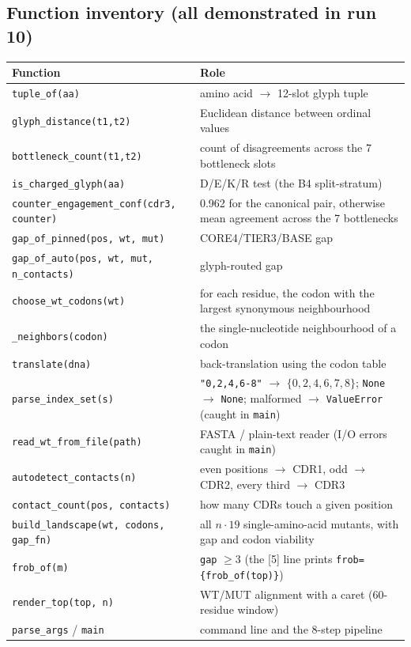 \documentclass{article}
\begin{document}
\subsection{Function inventory (all demonstrated in run 10)}

\begin{longtable}{@{}p{}p{}@{}}
\toprule
\textbf{Function} & \textbf{Role} \\
\midrule
\endhead
\texttt{tuple\_of(aa)} & amino acid \(\to\) 12-slot glyph tuple \\
\texttt{glyph\_distance(t1,t2)} & Euclidean distance between ordinal values \\
\texttt{bottleneck\_count(t1,t2)} & count of disagreements across the 7 bottleneck slots \\
\texttt{is\_charged\_glyph(aa)} & D/E/K/R test (the B4 split-stratum) \\
\texttt{counter\_engagement\_conf(cdr3, counter)} & 0.962 for the canonical pair, otherwise mean agreement across the 7 bottlenecks \\
\texttt{gap\_of\_pinned(pos, wt, mut)} & CORE4/TIER3/BASE gap \\
\texttt{gap\_of\_auto(pos, wt, mut, n\_contacts)} & glyph-routed gap \\
\texttt{choose\_wt\_codons(wt)} & for each residue, the codon with the largest synonymous neighbourhood \\
\texttt{\_neighbors(codon)} & the single-nucleotide neighbourhood of a codon \\
\texttt{translate(dna)} & back-translation using the codon table \\
\texttt{parse\_index\_set(s)} & \texttt{"0,2,4,6-8"} \(\to\) \(\{0,2,4,6,7,8\}\); \texttt{None} \(\to\) \texttt{None}; malformed \(\to\) \texttt{ValueError} (caught in \texttt{main}) \\
\texttt{read\_wt\_from\_file(path)} & FASTA / plain-text reader (I/O errors caught in \texttt{main}) \\
\texttt{autodetect\_contacts(n)} & even positions \(\to\) CDR1, odd \(\to\) CDR2, every third \(\to\) CDR3 \\
\texttt{contact\_count(pos, contacts)} & how many CDRs touch a given position \\
\texttt{build\_landscape(wt, codons, gap\_fn)} & all \(n\cdot 19\) single-amino-acid mutants, with gap and codon viability \\
\texttt{frob\_of(m)} & \texttt{gap} \(\geq 3\) (the [5] line prints \texttt{frob=\{frob\_of(top)\}}) \\
\texttt{render\_top(top, n)} & WT/MUT alignment with a caret (60-residue window) \\
\texttt{parse\_args} / \texttt{main} & command line and the 8-step pipeline \\
\bottomrule
\end{longtable}
\end{document}
